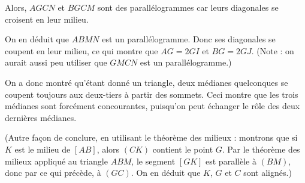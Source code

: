 \begin{exo}
\begin{sol}
Alors, $AGCN$ et $BGCM$ sont des parallélogrammes car leurs diagonales se croisent en leur milieu.

On en déduit que $ABMN$ est un parallélogramme. Donc ses diagonales se coupent en leur milieu, ce qui montre que $AG = 2GI$ et $BG = 2GJ$. (Note : on aurait aussi peu utiliser que $GMCN$ est un parallélogramme.)

On a donc montré qu'étant donné un triangle, deux médianes quelconques se coupent toujours aux deux-tiers à partir des sommets. Ceci montre que les trois médianes sont forcément concourantes, puisqu'on peut échanger le rôle des deux dernières médianes.

(Autre façon de conclure, en utilisant le théorème des milieux : montrons que si $K$ est le milieu de $[AB]$, alors $(CK)$ contient le point $G$. Par le théorème des milieux appliqué au triangle $ABM$, le segment $[GK]$ est parallèle à $(BM)$, donc par ce qui précède, à $(GC)$. On en déduit que $K$, $G$ et $C$ sont alignés.)
\end{sol}
\end{exo}


